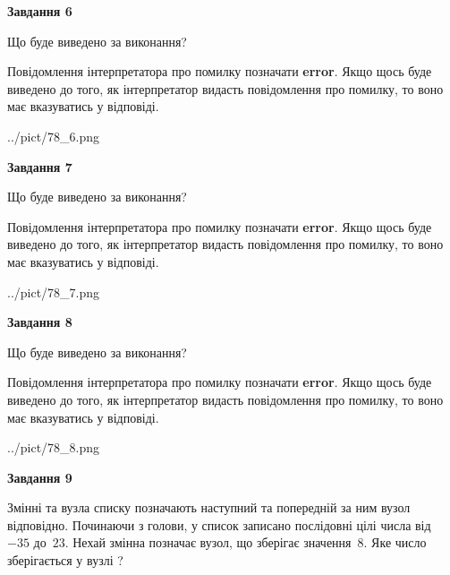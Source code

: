 \documentclass[12pt, ukrainian]{article}
\begin{document}
{\begin {large}
{\begin {center}\textbf{Завдання 6}\end {center}}\par
Що буде виведено за виконання?

Повідомлення інтерпретатора про помилку позначати \textbf{error}.
Якщо щось буде виведено до того, як інтерпретатор видасть повідомлення про помилку, 
то воно має вказуватись у відповіді. \par


\begin{center}
	{../pict/78_6.png}
\end{center}
\newpage

{\begin {center}\textbf{Завдання 7}\end {center}}\par
Що буде виведено за виконання?

Повідомлення інтерпретатора про помилку позначати \textbf{error}.
Якщо щось буде виведено до того, як інтерпретатор видасть повідомлення про помилку, 
то воно має вказуватись у відповіді. \par


\begin{center}
	{../pict/78_7.png}
\end{center}
\newpage

{\begin {center}\textbf{Завдання 8}\end {center}}\par
Що буде виведено за виконання?

Повідомлення інтерпретатора про помилку позначати \textbf{error}.
Якщо щось буде виведено до того, як інтерпретатор видасть повідомлення про помилку, 
то воно має вказуватись у відповіді. \par


\begin{center}
	{../pict/78_8.png}
\end{center}
\newpage

{\begin {center}\textbf{Завдання 9}\end {center}}\par
Змінні  та  вузла списку позначають наступний та попередній за ним вузол відповідно. Починаючи з голови, у список записано послідовні цілі числа від~$-35$ до~$23$. Нехай змінна  позначає вузол, що зберігає значення~$8$.
Яке число зберігається у вузлі  ?\par
\newpage


\end{large}}
\end{document}
